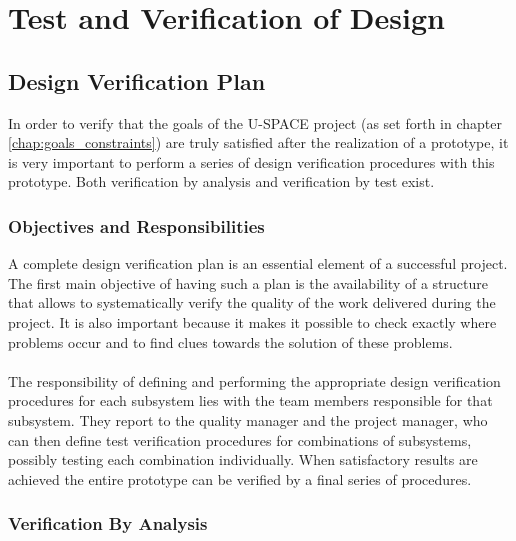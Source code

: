 \chapter{Test and Verification of Design}
\label{chap:test_verification}

\section{Design Verification Plan}
\label{sec:ver_plan}

In order to verify that the goals of the \ac{U-SPACE} project (as set forth in chapter \ref{chap:goals_constraints}) are truly satisfied after the realization of a prototype, it is very important to perform a series of design verification procedures with this prototype. Both verification by analysis and verification by test exist.

\subsection{Objectives and Responsibilities}

A complete design verification plan is an essential element of a successful project. The first main objective of having such a plan is the availability of a structure that allows to systematically verify the quality of the work delivered during the project. It is also important because it makes it possible to check exactly where problems occur and to find clues towards the solution of these problems.
\\
\\
The responsibility of defining and performing the appropriate design verification procedures for each subsystem lies with the team members responsible for that subsystem. They report to the quality manager and the project manager, who can then define test verification procedures for combinations of subsystems, possibly testing each combination individually. When satisfactory results are achieved the entire prototype can be verified by a final series of procedures.

\subsection{Verification By Analysis}

